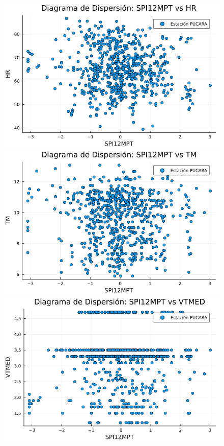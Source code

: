 \begin{figure}[htbp]
\begin{minipage}{0.32\textwidth}
    \centering
    \includegraphics[width=\linewidth]{Capitulos/Scaterplot/PUCARA_SPI12MPT_vs_HR.png}
\end{minipage}\hfill
\begin{minipage}{0.32\textwidth}
    \centering
    \includegraphics[width=\linewidth]{Capitulos/Scaterplot/PUCARA_SPI12MPT_vs_TM.png}
\end{minipage}\hfill
\begin{minipage}{0.32\textwidth}
    \centering
    \includegraphics[width=\linewidth]{Capitulos/Scaterplot/PUCARA_SPI12MPT_vs_VTMED.png}
\end{minipage}


\end{figure}
